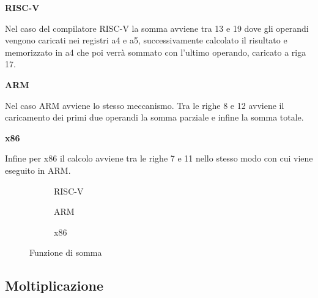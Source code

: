 \documentclass[12pt,a4paper]{report}
\begin{document}

\vspace{0.3 cm}
\textbf{RISC-V}

Nel caso del compilatore RISC-V la somma avviene tra 13 e 19 dove gli operandi vengono caricati nei registri a4 e a5,  successivamente calcolato il risultato e memorizzato in a4 che poi verrà sommato con l'ultimo operando, caricato a riga 17.

\vspace{0.3 cm}
\textbf{ARM}

Nel caso ARM avviene lo stesso meccanismo. Tra le righe 8 e 12 avviene il caricamento dei primi due operandi la somma parziale e infine la somma totale.

\vspace{0.3 cm}
\textbf{x86}

Infine per x86 il calcolo avviene tra le righe 7 e 11 nello stesso modo con cui viene eseguito in ARM.

\begin{figure}
     
     \begin{subfigure}[b]{0.3\textwidth}
  
        
	\label{Code:Add2RISC}
\caption{RISC-V}
     \end{subfigure}
     \hfill
     \begin{subfigure}[b]{0.3\textwidth}
         
          
          \label{Code:Add2ARM}
\caption{ARM}
     \end{subfigure}
     \hfill
     \begin{subfigure}[b]{0.3\textwidth}
         
          
	 \caption{x86}
	\label{Code:Add2X86}
     \end{subfigure}
    
        \caption{Funzione di somma}
        
\end{figure}



\subsection{Moltiplicazione}
\end{document}
